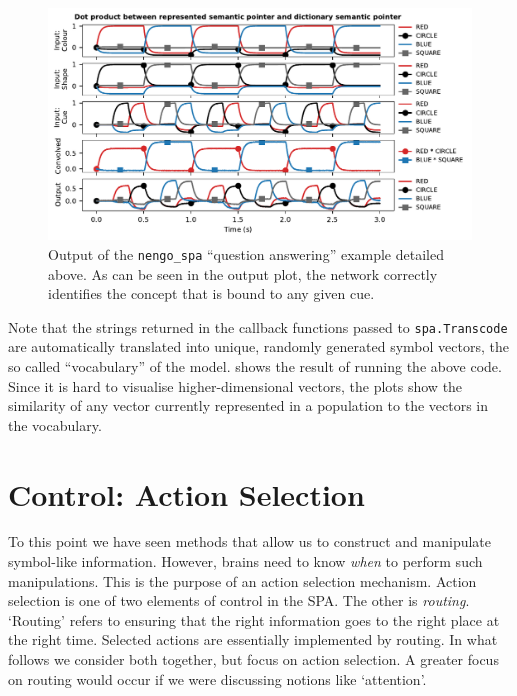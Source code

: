 \documentclass[10pt,letterpaper,oneside]{article}
\begin{document}
\begin{figure}
	\centering\hspace*{-0.33cm}\includegraphics{media/nengo_spa_example.pdf}
	\caption{Output of the \texttt{nengo\_spa} \enquote{question answering} example detailed above. As can be seen in the output plot, the network correctly identifies the concept that is bound to any given cue. }
	\label{fig:nengo_spa_example}
\end{figure}

Note that the strings returned in the callback functions passed to \texttt{spa.Transcode} are automatically translated into unique, randomly generated symbol vectors, the so called \enquote{vocabulary} of the model.  shows the result of running the above code. Since it is hard to visualise higher-dimensional vectors, the plots show the similarity of any vector currently represented in a population to the vectors in the vocabulary.


\section{Control: Action Selection}


To this point we have seen methods that allow us to construct and manipulate symbol-like information.  However, brains need to know \emph{when} to perform such manipulations.  This is the purpose of an action selection mechanism.  Action selection is one of two elements of control in the SPA. The other is \emph{routing}. `Routing' refers to ensuring that the right information goes to the right place at the right time. Selected actions are essentially implemented by routing. In what follows we consider both together, but focus on action selection.  A greater focus on routing would occur if we were discussing notions like `attention'.
\end{document}
